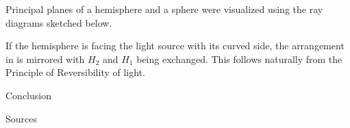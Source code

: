 \begin{paper}
	
	Principal planes of a hemisphere and a sphere were visualized using the ray diagrams sketched below.
	
	
	If the hemisphere is facing the light source with its curved side, the arrangement in \figHemisphere is mirrored with \( H_2 \) and \( H_1 \) being exchanged. This follows naturally from the Principle of Reversibility of light. 
	
	
	
	

		Conclusion 


	Sources

\end{paper}

